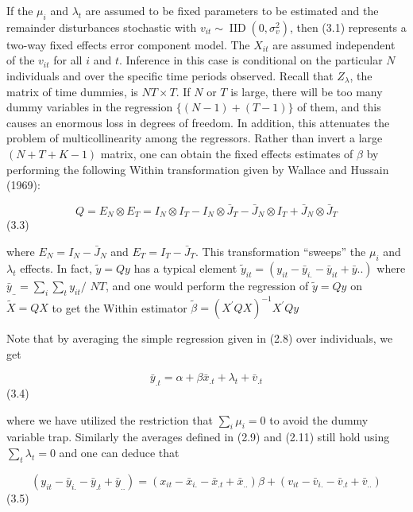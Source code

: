 \documentclass[
]{book}
\begin{document}
If the \(\mu_{i}\) and \(\lambda_{t}\) are assumed to be fixed parameters to be estimated and the remainder disturbances stochastic with \(v_{i t} \sim \operatorname{IID}\left(0, \sigma_{v}^{2}\right)\), then (3.1) represents a two-way fixed effects error component model. The \(X_{i t}\) are assumed independent of the \(v_{i t}\) for all \(i\) and \(t\). Inference in this case is conditional on the particular \(N\) individuals and over the specific time periods observed. Recall that \(Z_{\lambda}\), the matrix of time dummies, is \(N T \times T\). If \(N\) or \(T\) is large, there will be too many dummy variables in the regression \(\{(N-1)+(T-1)\}\) of them, and this causes an enormous loss in degrees of freedom. In addition, this attenuates the problem of multicollinearity among the regressors. Rather than invert a large \((N+T+K-1)\) matrix, one can obtain the fixed effects estimates of \(\beta\) by performing the following Within transformation given by Wallace and Hussain (1969):

\begin{equation}
Q=E_{N} \otimes E_{T}=I_{N} \otimes I_{T}-I_{N} \otimes \bar{J}_{T}-\bar{J}_{N} \otimes I_{T}+\bar{J}_{N} \otimes \bar{J}_{T}
\end{equation} (3.3)

where \(E_{N}=I_{N}-\bar{J}_{N}\) and \(E_{T}=I_{T}-\bar{J}_{T}\). This transformation ``sweeps'' the \(\mu_{i}\) and \(\lambda_{t}\) effects. In fact, \(\tilde{y}=Q y\) has a typical element \(\tilde{y}_{i t}=\left(y_{i t}-\bar{y}_{i .}-\bar{y}_{i t}+\bar{y} . .\right)\) where \(\bar{y}_{. .}=\sum_{i} \sum_{t} y_{i t} /\) \(N T\), and one would perform the regression of \(\tilde{y}=Q y\) on \(\widetilde{X}=Q X\) to get the Within estimator \(\widetilde{\beta}=\left(X^{\prime} Q X\right)^{-1} X^{\prime} Q y\)

Note that by averaging the simple regression given in (2.8) over individuals, we get

\begin{equation}
\bar{y}_{. t}=\alpha+\beta \bar{x}_{. t}+\lambda_{t}+\bar{v}_{. t}
\end{equation} (3.4)

where we have utilized the restriction that \(\sum_i \mu_i=0\) to avoid the dummy variable trap.
Similarly the averages defined in (2.9) and (2.11) still hold using \(\sum_t \lambda_t=0\) and one can deduce that

\begin{equation}
\left(y_{i t}-\bar{y}_{i .}-\bar{y}_{. t}+\bar{y}_{. .}\right)=\left(x_{i t}-\bar{x}_{i .}-\bar{x}_{. t}+\bar{x}_{. .}\right) \beta+\left(v_{i t}-\bar{v}_{i .}-\bar{v}_{. t}+\bar{v}_{. .}\right)
\end{equation} (3.5)
\end{document}
